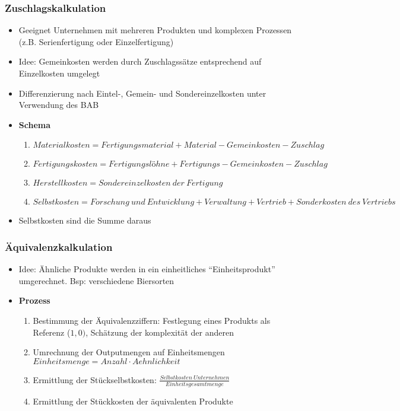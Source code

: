 \subsubsection{Zuschlagskalkulation}
\begin{itemize}
	\item Geeignet Unternehmen mit mehreren Produkten und komplexen Prozessen (z.B. Serienfertigung oder Einzelfertigung)
	\item Idee: Gemeinkosten werden durch Zuschlagssätze entsprechend auf Einzelkosten umgelegt
	\item Differenzierung nach Eintel-, Gemein- und Sondereinzelkosten unter Verwendung des BAB
	\item \textbf{Schema}
	\begin{enumerate}
		\item \(Materialkosten = Fertigungsmaterial + Material-Gemeinkosten-Zuschlag\)
		\item \(Fertigungskosten = Fertigungslöhne + Fertigungs-Gemeinkosten-Zuschlag\)
		\item \(Herstellkosten = Sondereinzelkosten~der~Fertigung\)
		\item \(Selbstkosten = Forschung~und~Entwicklung+Verwaltung + Vertrieb + Sonderkosten~des~Vertriebs\)
	\end{enumerate}
	\item Selbstkosten sind die Summe daraus
\end{itemize}

\subsubsection{Äquivalenzkalkulation}
\begin{itemize}
	\item Idee: Ähnliche Produkte werden in ein einheitliches "`Einheitsprodukt"' umgerechnet. Bsp: verschiedene Biersorten
	\item \textbf{Prozess}
	\begin{enumerate}
		\item Bestimmung der Äquivalenzziffern: Festlegung eines Produkts als Referenz (\(1,0)\), Schätzung der komplexität der anderen
		\item Umrechnung der Outputmengen auf Einheitsmengen \(Einheitsmenge = Anzahl \cdot Aehnlichkeit\)
		\item Ermittlung der Stückselbstkosten: \(\frac{Selbstkosten~Unternehmen}{Einheitsgesamtmenge}\)
		\item Ermittlung der Stückkosten der äquivalenten Produkte
	\end{enumerate}
\end{itemize}


